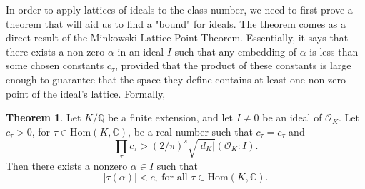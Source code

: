 \documentclass[12pt]{article}
\theoremstyle{definition}
\newtheorem{theorem}{Theorem}[section]
\begin{document}
In order to apply lattices of ideals to the class number, we need to first prove a theorem that will aid us to find a "bound" for ideals. The theorem comes as a direct
result of the Minkowski Lattice Point Theorem. Essentially, it says that there exists a non-zero
$\alpha$ in an ideal $I$ such that any embedding of $\alpha$ is less than some chosen 
constants $c_\tau$, provided that the product of these constants is large enough to guarantee that the space they 
define contains at least one non-zero point of the ideal's lattice. Formally,
\begin{theorem}\label{boundsTheorem}\cite{Eullery}
Let $K/\mathbb{Q}$ be a finite extension, and let $I\neq0$ be an ideal of $\mathcal{O}_K$. Let $c_\tau>0$,
for $\tau \in \text{Hom}(K,\mathbb{C})$, be a real number such that $c_\tau = c_{\bar{\tau}}$ and
\[ \prod_{\tau}c_\tau > (2/\pi)^s\sqrt{|d_K|}(\mathcal{O}_K:I).\]
Then there exists a nonzero $\alpha \in I$ such that
\[|\tau(\alpha)| < c_\tau \text{ for all } \tau \in \text{Hom}(K, \mathbb{C}).\]
\end{theorem}
\end{document}

